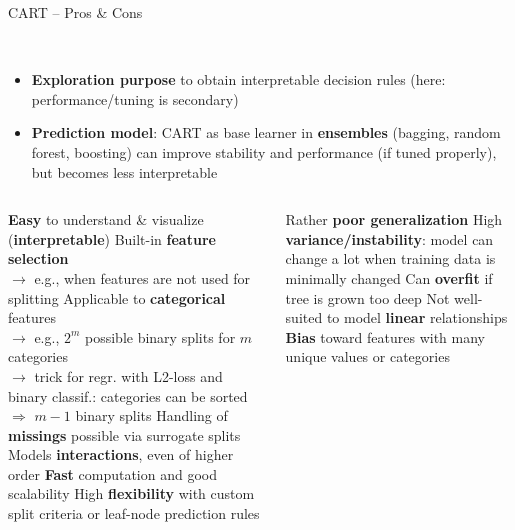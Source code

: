 \begin{frame}{CART -- Pros \& Cons}

 ~~ 
\begin{itemize}
    \item \textbf{Exploration purpose} to obtain interpretable decision rules (here: performance/tuning is secondary)
    \item \textbf{Prediction model}: CART as base learner in \textbf{ensembles} (bagging, random forest, boosting) can improve stability and performance (if tuned properly), but becomes less interpretable
\end{itemize}

\medskip
\begin{columns}[onlytextwidth]
  \begin{column}{0.5\textwidth}
    \footnotesize
    \begin{itemize}
      \positem \textbf{Easy} to understand \& visualize (\textbf{interpretable})
      \positem Built-in \textbf{feature selection}\\
      $\rightarrow$ e.g., when features are not used for splitting
      \positem Applicable to \textbf{categorical} features \\
      $\rightarrow$ e.g., $2^m$ possible binary splits for $m$ categories\\
       $\rightarrow$ trick for regr. with L2-loss and binary classif.: categories can be sorted $\Rightarrow$ $m-1$ binary splits 
      \positem Handling of \textbf{missings} possible via surrogate splits
      \positem Models  \textbf{interactions}, 
      even of higher order
      \positem \textbf{Fast} computation and good scalability
      \positem High \textbf{flexibility} with custom split criteria or leaf-node 
      prediction rules
    \end{itemize}
  \end{column}
  \begin{column}{0.5\textwidth}
    \footnotesize
    \begin{itemize}
      \negitem Rather \textbf{poor generalization} %
      \negitem High \textbf{variance/instability}: model can change a lot when training data is minimally changed
      \negitem Can \textbf{overfit} if tree is grown too deep
      \negitem Not well-suited to model \textbf{linear} relationships
      \negitem \textbf{Bias} toward features with many unique values or categories
    \end{itemize}
  \end{column}
\end{columns}

\vfill

\small


\end{frame}


